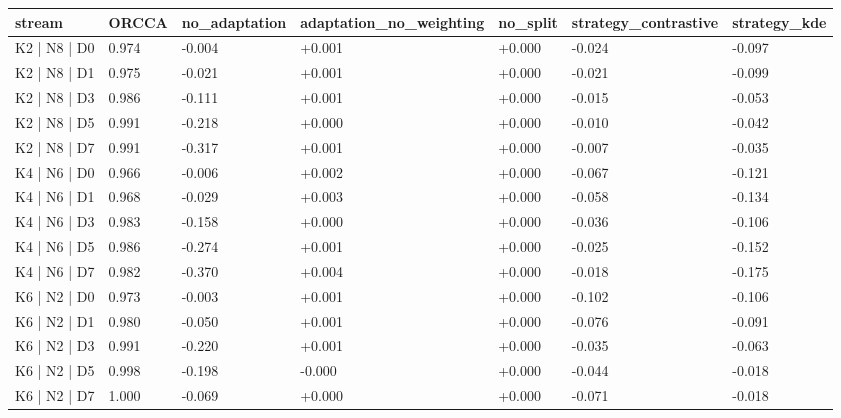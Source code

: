 \begin{tabular}{lllllll}
\hline
 stream       & ORCCA   & no\_adaptation   & adaptation\_no\_weighting   & no\_split   & strategy\_contrastive   & strategy\_kde   \\
\hline
 K2 | N8 | D0 & 0.974   & -0.004          & +0.001                    & +0.000     & -0.024                 & -0.097         \\
 K2 | N8 | D1 & 0.975   & -0.021          & +0.001                    & +0.000     & -0.021                 & -0.099         \\
 K2 | N8 | D3 & 0.986   & -0.111          & +0.001                    & +0.000     & -0.015                 & -0.053         \\
 K2 | N8 | D5 & 0.991   & -0.218          & +0.000                    & +0.000     & -0.010                 & -0.042         \\
 K2 | N8 | D7 & 0.991   & -0.317          & +0.001                    & +0.000     & -0.007                 & -0.035         \\
 K4 | N6 | D0 & 0.966   & -0.006          & +0.002                    & +0.000     & -0.067                 & -0.121         \\
 K4 | N6 | D1 & 0.968   & -0.029          & +0.003                    & +0.000     & -0.058                 & -0.134         \\
 K4 | N6 | D3 & 0.983   & -0.158          & +0.000                    & +0.000     & -0.036                 & -0.106         \\
 K4 | N6 | D5 & 0.986   & -0.274          & +0.001                    & +0.000     & -0.025                 & -0.152         \\
 K4 | N6 | D7 & 0.982   & -0.370          & +0.004                    & +0.000     & -0.018                 & -0.175         \\
 K6 | N2 | D0 & 0.973   & -0.003          & +0.001                    & +0.000     & -0.102                 & -0.106         \\
 K6 | N2 | D1 & 0.980   & -0.050          & +0.001                    & +0.000     & -0.076                 & -0.091         \\
 K6 | N2 | D3 & 0.991   & -0.220          & +0.001                    & +0.000     & -0.035                 & -0.063         \\
 K6 | N2 | D5 & 0.998   & -0.198          & -0.000                    & +0.000     & -0.044                 & -0.018         \\
 K6 | N2 | D7 & 1.000   & -0.069          & +0.000                    & +0.000     & -0.071                 & -0.018         \\
\hline
\end{tabular}